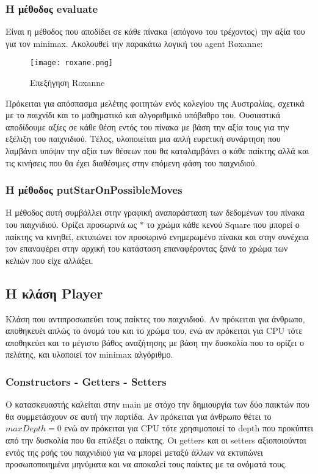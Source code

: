 \documentclass[12pt]{article}
\begin{document}
        \subsubsection{Η μέθοδος evaluate}
        Είναι η μέθοδος που αποδίδει σε κάθε πίνακα (απόγονο του τρέχοντος) την αξία του για τον minimax. Ακολουθεί την παρακάτω λογική του agent Roxanne:
        \begin{figure}[H]
            \centering
            \texttt{[image: roxane.png]}
            \caption{Επεξήγηση Roxanne}
        \end{figure}
        Πρόκειται για απόσπασμα μελέτης φοιτητών ενός κολεγίου της Αυστραλίας, σχετικά με το παιχνίδι και το μαθηματικό και αλγοριθμικό υπόβαθρο του. Ουσιαστικά αποδίδουμε αξίες σε κάθε θέση εντός του πίνακα με βάση την αξία τους για την εξέλιξη του παιχνιδιού. Τέλος, υλοποιείται μια απλή ευρετική συνάρτηση που λαμβάνει υπόψιν την αξία των θέσεων που θα καταλαμβάνει ο κάθε παίκτης αλλά και τις κινήσεις που θα έχει διαθέσιμες στην επόμενη φάση του παιχνιδιού. 
        \subsubsection{Η μέθοδος putStarOnPossibleMoves}
        Η μέθοδος αυτή συμβάλλει στην γραφική αναπαράσταση των δεδομένων του πίνακα του παιχνιδιού. Ορίζει προσωρινά ως $\ast$ το χρώμα κάθε κενού Square που μπορεί ο παίκτης να κινηθεί, εκτυπώνει τον προσωρινό ενημερωμένο πίνακα και στην συνέχεια τον επαναφέρει στην αρχική του κατάσταση επαναφέροντας ξανά το χρώμα των κελιών που είχε αλλάξει. 
    \subsection{Η κλάση Player}
    Κλάση που αντιπροσωπεύει τους παίκτες του παιχνιδιού. Αν πρόκειται για άνθρωπο, αποθηκευέι απλώς το όνομά του και το χρώμα του, ενώ αν πρόκειται για CPU τότε αποθηκεύει και το μέγιστο βάθος αναζήτησης με βάση την δυσκολία που το ορίζει ο πελάτης, και υλοποιεί τον minimax αλγόριθμο.
        \subsubsection{Constructors - Getters - Setters}
        Ο κατασκευαστής καλείται στην main με στόχο την δημιουργία των δύο παικτών που θα συμμετάσχουν σε αυτή την παρτίδα. Αν πρόκειται για άνθρωπο θέτει το $maxDepth = 0$ ενώ αν πρόκειται για CPU τότε χρησιμοποιεί το depth που προκύπτει από την δυσκολία που θα επιλέξει ο παίκτης. Οι getters και οι setters αξιοποιούνται εντός της ροής του παιχνιδιού για να μπορεί μεταξύ άλλων να εκτυπώνει προσωποποιημένα μηνύματα και να αποκαλεί τους παίκτες με τα ονόματά τους. 
\end{document}
